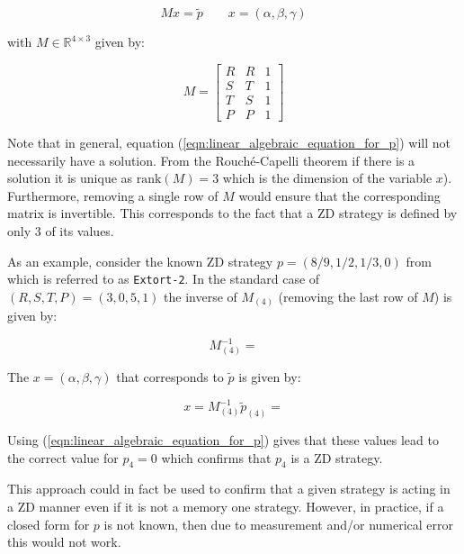 \documentclass[a4paper]{article}
\begin{document}
\begin{equation}\label{eqn:linear_algebraic_equation_for_p}
    Mx=\tilde p  \qquad x=(\alpha, \beta, \gamma)
\end{equation}

with \(M\in\mathbb{R}^{4\times 3}\) given by:

\begin{equation}\label{eqn:definition_of_M}
    M =
    \begin{bmatrix}
        R & R & 1\\
        S & T & 1\\
        T & S & 1\\
        P & P & 1
    \end{bmatrix}
\end{equation}

Note that in general, equation (\ref{eqn:linear_algebraic_equation_for_p}) will
not necessarily have a solution. From the Rouché-Capelli theorem if there is a
solution it is unique as \(\text{rank}(M)=3\) which is the dimension of the
variable \(x\)). Furthermore, removing a single row of \(M\) would ensure that
the corresponding matrix is invertible. This corresponds to the fact that a ZD
strategy is defined by only 3 of its values.

As an example, consider the known ZD strategy \(p=(8 / 9, 1 / 2, 1 / 3, 0)\)
from~\cite{Stewart2012} which is referred to as \texttt{Extort-2}. In the
standard case of \((R, S, T, P)=(3, 0, 5, 1)\) the inverse
of \(M_{(4)}\) (removing the last row of \(M\)) is given by:

\begin{equation}\label{eqn:inverse_of_M4}
    M_{(4)}^{-1} =
    
\end{equation}

The \(x=(\alpha, \beta, \gamma)\) that corresponds to
\(\tilde p\) is given by:

\begin{equation}\label{eqn:alpha_beta_gamma_for_extort_2}
    x = M_{(4)}^{-1}\tilde p_{(4)} =
    
\end{equation}

Using (\ref{eqn:linear_algebraic_equation_for_p}) gives that these values lead
to the correct value for \(p_4=0\) which confirms that \(p_4\) is a ZD strategy.

This approach could in fact be used to confirm that a given strategy is acting
in a ZD manner even if it is not a memory one strategy. However, in practice, if
a closed form for \(p\) is not known, then due to measurement and/or numerical
error this would not work.
\end{document}
